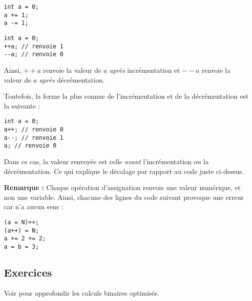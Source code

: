 \documentclass[../../../main.tex]{subfiles}
\begin{document}
\begin{minipage}{0.5\textwidth}
\begin{verbatim}
int a = 0;
a += 1;
a -= 1;
\end{verbatim}
\end{minipage}
\begin{minipage}{0.5\textwidth}
\begin{verbatim}
int a = 0;
++a; // renvoie 1
--a; // renvoie 0
\end{verbatim}
\end{minipage}

Ainsi, $++a$ renvoie la valeur de $a$ \textit{après} incrémentation et $--a$ renvoie la valeur de $a$ \textit{après} décrémentation.
 
Toutefois, la forme la plus connue de l'incrémentation et de la décrémentation est la suivante :
\begin{verbatim}
int a = 0;
a++; // renvoie 0
a--; // renvoie 1
a; // renvoie 0
\end{verbatim}
Dans ce cas, la valeur renvoyée est celle \textit{avant} l'incrémentation ou la décrémentation. Ce qui explique le décalage par rapport au code juste ci-dessus.
 
\textbf{Remarque :} Chaque opération d'assignation renvoie une valeur numérique, et non une variable. Ainsi, chacune des lignes du code suivant provoque une erreur car n'a aucun sens :
\begin{verbatim}
(a = N)++;
(a++) = N;
a += 2 += 2;
a = b = 3;
\end{verbatim}
\subsection{Exercices}
Voir \cite{BitHacks} pour approfondir les calculs binaires optimisés.
\end{document}
